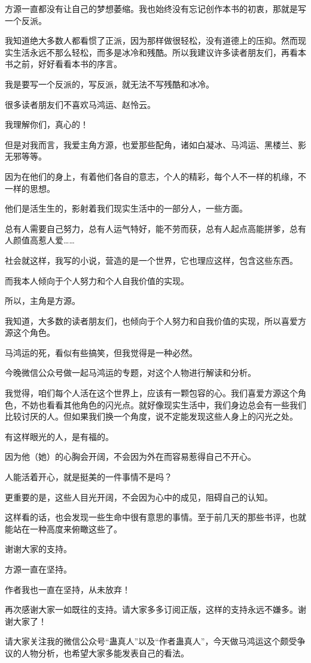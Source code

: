 \begin{this_body}
方源一直都没有让自己的梦想萎缩。我也始终没有忘记创作本书的初衷，那就是写一个反派。

我知道绝大多数人都看惯了正派，因为那样做很轻松，没有道德上的压抑。然而现实生活永远不那么轻松，而多是冰冷和残酷。所以我建议许多读者朋友们，再看本书之前，好好看看本书的序言。

我是要写一个反派的，写反派，就无法不写残酷和冰冷。

很多读者朋友们不喜欢马鸿运、赵怜云。

我理解你们，真心的！

但是对我而言，我爱主角方源，也爱那些配角，诸如白凝冰、马鸿运、黑楼兰、影无邪等等。

因为在他们的身上，有着他们各自的意志，个人的精彩，每个人不一样的机缘，不一样的思想。

他们是活生生的，影射着我们现实生活中的一部分人，一些方面。

总有人需要自己努力，总有人运气特好，能不劳而获，总有人起点高能拼爹，总有人颜值高惹人爱……

社会就这样，我写的小说，营造的是一个世界，它也理应这样，包含这些东西。

而我本人倾向于个人努力和个人自我价值的实现。

所以，主角是方源。

我知道，大多数的读者朋友们，也倾向于个人努力和自我价值的实现，所以喜爱方源这个角色。

马鸿运的死，看似有些搞笑，但我觉得是一种必然。

今晚微信公众号做一起马鸿运的专题，对这个人物进行解读和分析。

我觉得，咱们每个人活在这个世界上，应该有一颗包容的心。我们喜爱方源这个角色，不妨也看看其他角色的闪光点。就好像现实生活中，我们身边总会有一些我们比较讨厌的人。但如果我们换一个角度，说不定能发现这些人身上的闪光之处。

有这样眼光的人，是有福的。

因为他（她）的心胸会开阔，不会因为外在而容易惹得自己不开心。

人能活着开心，就是挺美的一件事情不是吗？

更重要的是，这些人目光开阔，不会因为心中的成见，阻碍自己的认知。

这样看的话，也会发现一些生命中很有意思的事情。至于前几天的那些书评，也就能站在一种高度来俯瞰这些了。

谢谢大家的支持。

方源一直在坚持。

作者我也一直在坚持，从未放弃！

再次感谢大家一如既往的支持。请大家多多订阅正版，这样的支持永远不嫌多。谢谢大家了！

请大家关注我的微信公众号“蛊真人”以及“作者蛊真人”，今天做马鸿运这个颇受争议的人物分析，也希望大家多能发表自己的看法。

\end{this_body}

